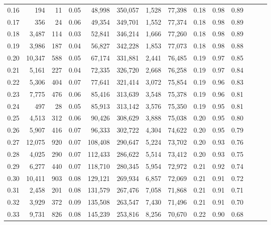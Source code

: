 \begin{tabular}{rrrrrrrrrrrrrr}
0.16 &     194 &     11 &  0.05 &   48,998 &  350,057 &   1,528 &  77,398 &  0.18 &  0.98 &      0.89 \\
0.17 &     356 &     24 &  0.06 &   49,354 &  349,701 &   1,552 &  77,374 &  0.18 &  0.98 &      0.89 \\
0.18 &   3,487 &    114 &  0.03 &   52,841 &  346,214 &   1,666 &  77,260 &  0.18 &  0.98 &      0.89 \\
0.19 &   3,986 &    187 &  0.04 &   56,827 &  342,228 &   1,853 &  77,073 &  0.18 &  0.98 &      0.88 \\
0.20 &  10,347 &    588 &  0.05 &   67,174 &  331,881 &   2,441 &  76,485 &  0.19 &  0.97 &      0.85 \\
0.21 &   5,161 &    227 &  0.04 &   72,335 &  326,720 &   2,668 &  76,258 &  0.19 &  0.97 &      0.84 \\
0.22 &   5,306 &    404 &  0.07 &   77,641 &  321,414 &   3,072 &  75,854 &  0.19 &  0.96 &      0.83 \\
0.23 &   7,775 &    476 &  0.06 &   85,416 &  313,639 &   3,548 &  75,378 &  0.19 &  0.96 &      0.81 \\
0.24 &     497 &     28 &  0.05 &   85,913 &  313,142 &   3,576 &  75,350 &  0.19 &  0.95 &      0.81 \\
0.25 &   4,513 &    312 &  0.06 &   90,426 &  308,629 &   3,888 &  75,038 &  0.20 &  0.95 &      0.80 \\
0.26 &   5,907 &    416 &  0.07 &   96,333 &  302,722 &   4,304 &  74,622 &  0.20 &  0.95 &      0.79 \\
0.27 &  12,075 &    920 &  0.07 &  108,408 &  290,647 &   5,224 &  73,702 &  0.20 &  0.93 &      0.76 \\
0.28 &   4,025 &    290 &  0.07 &  112,433 &  286,622 &   5,514 &  73,412 &  0.20 &  0.93 &      0.75 \\
0.29 &   6,277 &    440 &  0.07 &  118,710 &  280,345 &   5,954 &  72,972 &  0.21 &  0.92 &      0.74 \\
0.30 &  10,411 &    903 &  0.08 &  129,121 &  269,934 &   6,857 &  72,069 &  0.21 &  0.91 &      0.72 \\
0.31 &   2,458 &    201 &  0.08 &  131,579 &  267,476 &   7,058 &  71,868 &  0.21 &  0.91 &      0.71 \\
0.32 &   3,929 &    372 &  0.09 &  135,508 &  263,547 &   7,430 &  71,496 &  0.21 &  0.91 &      0.70 \\
0.33 &   9,731 &    826 &  0.08 &  145,239 &  253,816 &   8,256 &  70,670 &  0.22 &  0.90 &      0.68 \\

\end{tabular}
